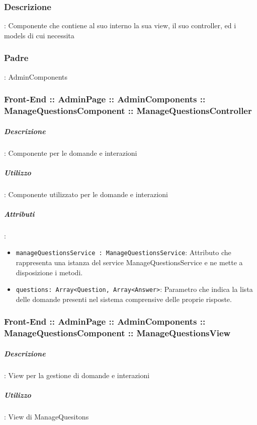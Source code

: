 \documentclass[../ManualeSviluppatore_v1.0.0.tex]{subfiles}
\begin{document}
			\subsubsection{Descrizione}: Componente che contiene al suo interno la sua view, il suo controller, ed i models di cui necessita
			\subsubsection{Padre}: AdminComponents
			      \subsubsection{Front-End :: AdminPage :: AdminComponents :: ManageQuestionsComponent :: ManageQuestionsController}
			      	\subparagraph{Descrizione}: Componente per le domande e interazioni
			      	\subparagraph{Utilizzo}: Componente utilizzato per le domande e interazioni
			      	\subparagraph{Attributi}:
      	      			\begin{itemize}
							\item \texttt{manageQuestionsService : ManageQuestionsService}: Attributo che rappresenta una istanza del service ManageQuestionsService e ne mette a disposizione i metodi.
							\item \texttt{questions: Array<Question, Array<Answer>}: Parametro che indica la lista delle domande presenti nel sistema comprensive delle proprie risposte.
						\end{itemize}
					\subsubsection{Front-End :: AdminPage :: AdminComponents :: ManageQuestionsComponent :: ManageQuestionsView}
						\subparagraph{Descrizione}: View per la gestione di domande e interazioni
						\subparagraph{Utilizzo}: View di ManageQuesitons

	\newpage
\end{document}
